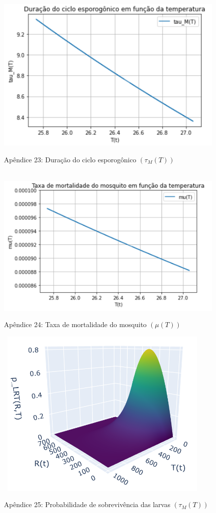 \documentclass[12pt]{article}
\begin{document}
\newpage
\begin{figure}[!ht]
        \centering
        \hbox{\hspace{3.0em} \includegraphics[scale=1.0] {Plot_tau_M(T).png}}
        \caption*{Apêndice 23: Duração do ciclo esporogônico $(\tau_{M}(T))$} 
\end{figure} 
\begin{figure}[!ht]
        \centering
        \hbox{\hspace{1.5em} \includegraphics[scale=1.0] {Plot_mu(T).png}}
        \caption*{Apêndice 24: Taxa de mortalidade do mosquito $(\mu(T))$} 
\end{figure} 
\newpage
\begin{figure}[!ht]
        \centering
        \hbox{\hspace{2.7em} \includegraphics[scale=1.0] {Plot_p_LRT(R,T)_c1_c2_corrigido.png}}
        \caption*{Apêndice 25: Probabilidade de sobrevivência das larvas $(\tau_{M}(T))$} 
\end{figure} 
\end{document}

